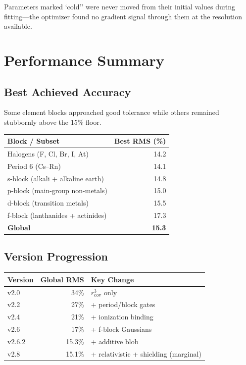 \documentclass[11pt,a4paper]{article}
\begin{document}
\noindent Parameters marked `cold'' were never moved from their initial
values during fitting---the optimizer found no gradient signal through them
at the resolution available.

\section{Performance Summary}

\subsection{Best Achieved Accuracy}

Some element blocks approached good tolerance while others remained
stubbornly above the 15\% floor.

\begin{center}
\begin{tabular}{lr}
\toprule
\textbf{Block / Subset}  & \textbf{Best RMS (\%)} \\
\midrule
Halogens (F, Cl, Br, I, At)       & 14.2 \\
Period 6 (Cs--Rn)                  & 14.1 \\
s-block (alkali + alkaline earth)  & 14.8 \\
p-block (main-group non-metals)    & 15.0 \\
d-block (transition metals)        & 15.5 \\
f-block (lanthanides + actinides)  & 17.3 \\
\midrule
\textbf{Global}                    & \textbf{15.3} \\
\bottomrule
\end{tabular}
\end{center}

\subsection{Version Progression}

\begin{center}
\begin{tabular}{lrl}
\toprule
\textbf{Version} & \textbf{Global RMS} & \textbf{Key Change} \\
\midrule
v2.0 & 34\% & $r_\mathrm{cov}^3$ only \\
v2.2 & 27\% & + period/block gates \\
v2.4 & 21\% & + ionization binding \\
v2.6 & 17\% & + f-block Gaussians \\
v2.6.2 & 15.3\% & + additive blob \\
v2.8 & 15.1\% & + relativistic + shielding (marginal) \\
\bottomrule
\end{tabular}
\end{center}
\end{document}
